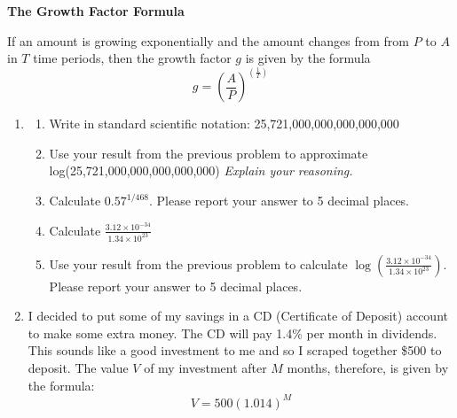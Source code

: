 \documentclass[12pt]{article}
\begin{document}
 \vspace{.2in}
 
 \begin{center}
\textbf{The Growth Factor Formula}
\vspace{.1in}

If an amount is growing exponentially and the amount changes from from $P$ to $A$ \\ in $T$ time periods, then the growth factor $g$ is given by the formula $$g=\left(\frac{A}{P}\right)^{\left(\frac{1}{T}\right)}$$

 \end{center}

\hrulefill

\newpage

\begin{enumerate}

\item \begin{enumerate}
\item Write in standard scientific notation:  25,721,000,000,000,000,000
\vfill
\item Use your result from the previous problem to approximate log(25,721,000,000,000,000,000)  \emph{Explain your reasoning.}
\vfill
\item Calculate $0.57^{1/468}$.  Please report your answer to 5 decimal places.
\vfill
\item Calculate $\displaystyle \frac{3.12 \times 10^{-34}}{1.34 \times 10^{23}} $
\vfill
\item Use your result from the previous problem to calculate $\displaystyle \log \left( \frac{3.12 \times 10^{-34}}{1.34 \times 10^{23}} \right)$. Please report your answer to 5 decimal places.
\vfill
\end{enumerate}

\newpage
\item I decided to put some of my savings in a CD (Certificate of Deposit) account to make some extra money.  The CD will pay 1.4\% per month in dividends.  This sounds like a good investment to me and so I scraped together \$500 to deposit.  The value $V$ of my investment after $M$ months, therefore, is given by the formula: $$V=500(1.014)^M$$


\end{enumerate}
\end{document}
